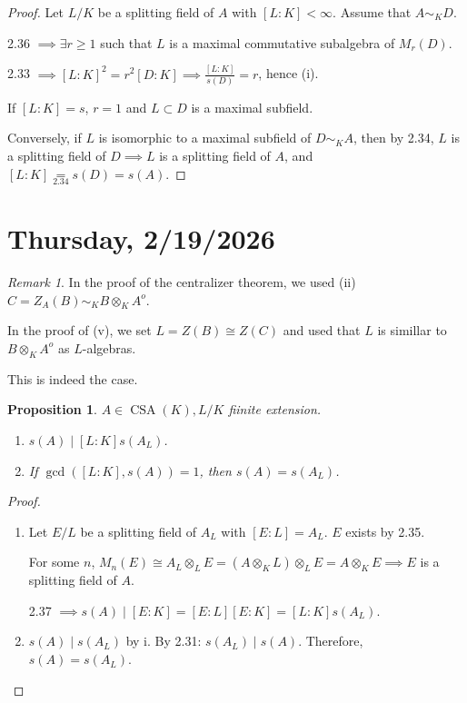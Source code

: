 \documentclass{article}
\theoremstyle{definition}
\theoremstyle{plain}
\newtheorem{proposition}[theorem]{Proposition}
\theoremstyle{remark}
\newtheorem*{remark*}{Remark}
\begin{document}
    \begin{proof}
        Let \(L / K\) be a splitting field of \(A\) with \([L:K] < \infty\). Assume that \(A \sim_K D\).

        2.36 \(\implies \exists r \geq 1\) such that \(L\) is a maximal commutative subalgebra of \(M_r(D)\).

        2.33 \(\implies [L:K]^2 = r^2[D:K] \implies \frac{[L:K]}{s(D)} = r\), hence (i).

        If \([L:K] = s\), \(r = 1\) and \(L \subset D\) is a maximal subfield.

        Conversely, if \(L\) is isomorphic to a maximal subfield of \(D \sim_K A\), then by 2.34, \(L\) is a splitting field of \(D \implies L\) is a splitting field of \(A\), and \([L:K] \underset{2.34}{=} s(D) = s(A)\).
    \end{proof}

    \section*{Thursday, 2/19/2026}
    
    \begin{remark*}
        In the proof of the centralizer theorem, we used (ii) \(C = Z_A(B) \sim_K B \otimes_K A^o.\)

        In the proof of (v), we set \(L = Z(B) \cong Z(C)\) and used that \(L\) is simillar to \(B \otimes_K A^o\) as \(L\)-algebras.

        This is indeed the case.

    \end{remark*}

    \begin{proposition}
        \(A \in \operatorname{CSA}(K), L / K\) fiinite extension.

        \begin{enumerate}[label=\roman*)]
            \item \(s(A) \mid [L:K]s(A_L)\).
            \item If \(\operatorname{gcd}([L:K] , s(A)) = 1\), then \(s(A) = s(A_L)\).  
        \end{enumerate} 
    \end{proposition}

    \begin{proof}
        \begin{enumerate}[label=\roman*)]
            \item Let \(E / L\) be a splitting field of \(A_L\) with \([E:L] = A_L\). \(E\) exists by 2.35.
            
            For some \(n\), \(M_n(E) \cong A_L \otimes_L E = (A \otimes_K L) \otimes_L E = A \otimes_K E \implies E\) is a splitting field of \(A\).

            2.37 \(\implies s(A) \mid [E:K] = [E:L][E:K] = [L:K] s(A_L)\).

            \item \(s(A) \mid s(A_L)\) by i. By 2.31: \(s(A_L) \mid s(A)\). Therefore, \(s(A) = s(A_L)\).
        \end{enumerate} 
    \end{proof}
\end{document}
